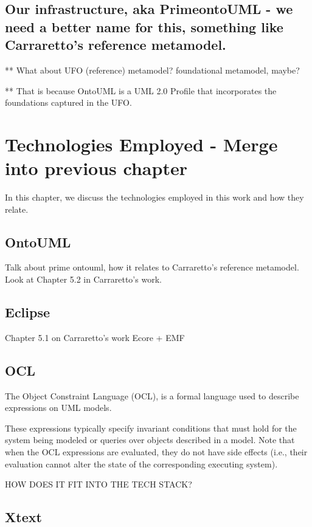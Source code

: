 \documentclass[
	10pt,				%
	oneside,
	a4paper,			%
	brazil,
	english
	]{abntex2}
\begin{document}
\section{Our infrastructure, aka PrimeontoUML - we need a better name for this, something like Carraretto's reference metamodel.}

** What about UFO (reference) metamodel? foundational metamodel, maybe?

** That is because OntoUML is a UML 2.0 Profile that incorporates the foundations captured in the UFO.

\chapter{Technologies Employed - Merge into previous chapter}

In this chapter, we discuss the technologies employed in this work and how they
relate.

\section{OntoUML}

Talk about prime ontouml, how it relates to Carraretto's reference metamodel.
Look at Chapter 5.2 in Carraretto's work.

\section{Eclipse}

Chapter 5.1 on Carraretto's work
Ecore + EMF

\section{OCL}

The Object Constraint Language (OCL)\cite{OCL20}, is a formal language used to
describe expressions on UML models.

These expressions typically specify invariant conditions that must hold for the
system being modeled or queries over objects described in a model. Note that when
the OCL expressions are evaluated, they do not have side effects (i.e., their
evaluation cannot alter the state of the corresponding executing system).

HOW DOES IT FIT INTO THE TECH STACK?

\section{Xtext}
\end{document}
